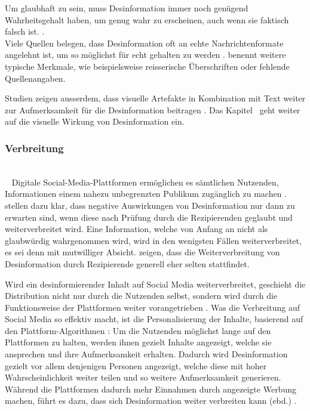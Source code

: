 \documentclass[12pt,a4paper]{article}        %
\begin{document}
Um glaubhaft zu sein, muss Desinformation immer noch genügend Wahrheitsgehalt haben, um genug wahr zu erscheinen, auch wenn sie faktisch falsch ist. \parencite[Pennycook et al. (2018), zit\ nach][182]{weidner_fake_2019}. \\
Viele Quellen belegen, dass Desinformation oft an echte Nachrichtenformate angelehnt ist, um so möglichst für echt gehalten zu werden \parencites[3]{tandoc_jr_facts_2019}[213]{allcott_social_2017}[1094]{lazer_science_2018}[10f]{grujic_warnhinweise_2024}. \textcite[15]{grujic_warnhinweise_2024} benennt weitere typische Merkmale, wie beispielsweise reisserische Überschriften oder fehlende Quellenangaben.

\pagebreak
Studien zeigen ausserdem, dass visuelle Artefakte in Kombination mit Text weiter zur Aufmerksamkeit für die Desinformation beitragen \parencites[3701]{weikmann_visual_2023}[182]{weidner_fake_2019}. Das Kapitel~ geht weiter auf die visuelle Wirkung von Desinformation ein.

\subsubsection{Verbreitung}\\
~\label{theory_distribution}
Digitale Social-Media-Plattformen ermöglichen es sämtlichen Nutzenden, Informationen einem nahezu unbegrenzten Publikum zugänglich zu machen \parencite[147]{marx_fake_2020}. \textcite[485]{schaewitz_when_2020} stellen dazu klar, dass negative Auswirkungen von Desinformation nur dann zu erwarten sind, wenn diese nach Prüfung durch die Rezipierenden geglaubt und weiterverbreitet wird. Eine Information, welche von Anfang an nicht als glaubwürdig wahrgenommen wird, wird in den wenigsten Fällen weiterverbreitet, es sei denn mit mutwilliger Absicht. \textcite{guess_less_2019} zeigen, dass die Weiterverbreitung von Desinformation durch Rezipierende generell eher selten stattfindet.

Wird ein desinformierender Inhalt auf Social Media weiterverbreitet, geschieht die Distribution nicht nur durch die Nutzenden selbst, sondern wird durch die Funktionsweise der Plattformen weiter vorangetrieben \parencite[vgl.\ auch][199]{krafft_disinformation_2020}.
Was die Verbreitung auf Social Media so effektiv macht, ist die Personalisierung der Inhalte, basierend auf den Plattform-Algorithmen \parencite[219f]{schmidt_meinungsbildung_2022}: Um die Nutzenden möglichst lange auf den Plattformen zu halten, werden ihnen gezielt Inhalte angezeigt, welche sie ansprechen und ihre Aufmerksamkeit erhalten. Dadurch wird Desinformation gezielt vor allem denjenigen Personen angezeigt, welche diese mit hoher Wahrscheinlichkeit weiter teilen und so weitere Aufmerksamkeit generieren. Während die Plattformen dadurch mehr Einnahmen durch angezeigte Werbung machen, führt es dazu, dass sich Desinformation weiter verbreiten kann (ebd.) \parencite[vgl.\ auch][967]{ghai_deep-learning-based_2024}.
\end{document}
